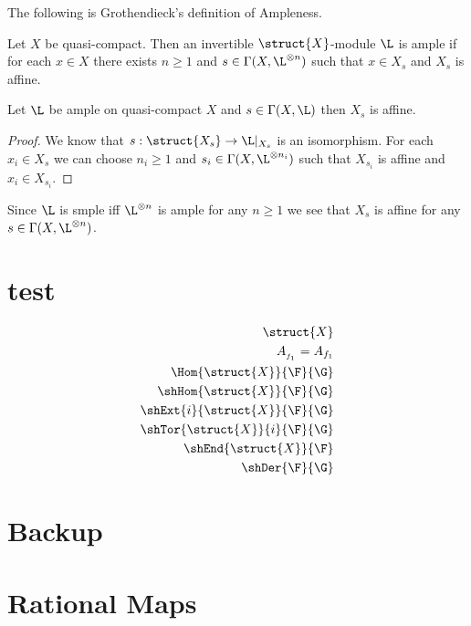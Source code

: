 \documentclass[12pt]{article}
\begin{document}
\begin{rmk}
The following is Grothendieck's definition of Ampleness.
\end{rmk}

\begin{defn}
Let $X$ be quasi-compact. Then an invertible $\struct{X}$-module $\L$ is ample if for each $x \in X$ there exists $n \ge 1$ and $s \in \Gamma(X, \L^{\otimes n})$ such that $x \in X_s$ and $X_s$ is affine.
\end{defn}

\begin{theorem}
Let $\L$ be ample on quasi-compact $X$ and $s \in \Gamma(X, \L)$ then $X_s$ is affine.
\end{theorem}

\begin{proof}
We know that $s : \struct{X_s} \to \L|_{X_s}$ is an isomorphism. For each $x_i \in X_s$ we can choose $n_i \ge 1$ and $s_i \in \Gamma(X, \L^{\otimes n_i})$ such that $X_{s_i}$ is affine and $x_i \in X_{s_i}$.  
\end{proof}

\begin{rmk}
Since $\L$ is smple iff $\L^{\otimes n}$ is ample for any $n \ge 1$ we see that $X_s$ is affine for any $s \in \Gamma(X, \L^{\otimes n})$. 
\end{rmk}

\section{test}

\begin{align*}
\struct{X}
\\
A_{_{f_1}} = A_{f_1}
\\
\Hom{\struct{X}}{\F}{\G}
\\
\shHom{\struct{X}}{\F}{\G}
\\
\shExt{i}{\struct{X}}{\F}{\G}
\\
\shTor{\struct{X}}{i}{\F}{\G}
\\
\shEnd{\struct{X}}{\F}
\\
\shDer{\F}{\G}
\end{align*}

\section{Backup}

\section{Rational Maps}
\end{document}
